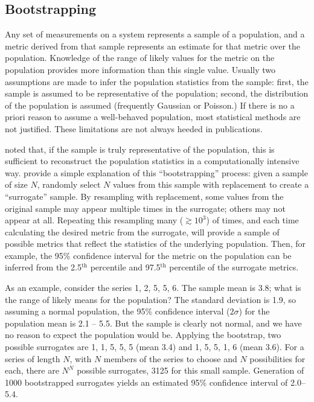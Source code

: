 \documentclass[letterpaper,11pt]{article}
\begin{document}
\subsection{Bootstrapping}
\label{sec:boots}
Any set of measurements on a system represents a sample of a
population, and a metric derived from that sample represents an
estimate for that metric over the population. Knowledge of the range
of likely values for the metric on the population provides more
information than this single value.  Usually two assumptions are made
to infer the population statistics from the sample: first, the sample
is assumed to be representative of the population; second, the
distribution of the population is assumed (frequently Gaussian or
Poisson.) If there is no a priori reason to assume a
well-behaved population, most statistical methods are not
justified. These limitations are not always heeded in publications.

\citet{efron79} noted that, if the sample is truly representative of
the population, this is sufficient to reconstruct the population
statistics in a computationally intensive way. \citet{diaconis83}
provide a simple explanation of this
``bootstrapping'' process: given a sample of size $N$, randomly select
$N$ values from this sample with replacement to create a ``surrogate''
sample. By resampling with replacement, some values from the original
sample may appear multiple times in the surrogate; others may not
appear at all. Repeating this resampling many ($\gtrsim 10^{3}$) of
times, and each time calculating the desired metric from the
surrogate, will provide a sample of possible metrics that reflect the
statistics of the underlying population. Then, for example, the 95\%
confidence interval for the metric on the population can be
inferred from the 2.5$^{\mathrm{th}}$ percentile and
97.5$^{\mathrm{th}}$ percentile of the surrogate metrics.

As an example, consider the series 1, 2, 5, 5, 6. The sample mean is
3.8; what is the range of likely means for the population? The
standard deviation is 1.9, so assuming a normal population, the 95\%
confidence interval ($2\sigma$) for the population mean is 2.1 --
5.5. But the sample is clearly not normal, and we have no reason to
expect the population would be. Applying the bootstrap, two possible
surrogates are 1, 1, 5, 5, 5 (mean 3.4) and 1, 5, 5, 1, 6 (mean 3.6).
For a series of length $N$, with $N$ members of the series to
choose and $N$ possibilities for each, there are $N^N$ possible
surrogates, 3125 for this small sample. Generation of 1000
bootstrapped surrogates yields an estimated 95\% confidence interval
of 2.0--5.4.
\end{document}
